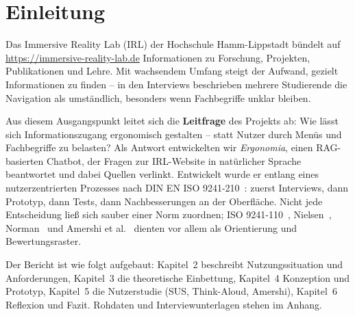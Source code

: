 \section{Einleitung}

Das Immersive Reality Lab (IRL) der Hochschule Hamm-Lippstadt bündelt auf \url{https://immersive-reality-lab.de} Informationen zu Forschung, Projekten, Publikationen und Lehre. Mit wachsendem Umfang steigt der Aufwand, gezielt Informationen zu finden -- in den Interviews beschrieben mehrere Studierende die Navigation als umständlich, besonders wenn Fachbegriffe unklar bleiben.

Aus diesem Ausgangspunkt leitet sich die \textbf{Leitfrage} des Projekts ab: Wie lässt sich Informationszugang ergonomisch gestalten -- statt Nutzer durch Menüs und Fachbegriffe zu belasten? Als Antwort entwickelten wir \textit{Ergonomia}, einen RAG-basierten Chatbot, der Fragen zur IRL-Website in natürlicher Sprache beantwortet und dabei Quellen verlinkt. Entwickelt wurde er entlang eines nutzerzentrierten Prozesses nach DIN EN ISO 9241-210~\cite{iso9241-210}: zuerst Interviews, dann Prototyp, dann Tests, dann Nachbesserungen an der Oberfläche. Nicht jede Entscheidung ließ sich sauber einer Norm zuordnen; ISO 9241-110~\cite{iso9241}, Nielsen~\cite{nielsen1994}, Norman~\cite{norman2013} und Amershi et al.~\cite{amershi2019} dienten vor allem als Orientierung und Bewertungsraster.

Der Bericht ist wie folgt aufgebaut: Kapitel~2 beschreibt Nutzungssituation und Anforderungen, Kapitel~3 die theoretische Einbettung, Kapitel~4 Konzeption und Prototyp, Kapitel~5 die Nutzerstudie (SUS, Think-Aloud, Amershi), Kapitel~6 Reflexion und Fazit. Rohdaten und Interviewunterlagen stehen im Anhang.
